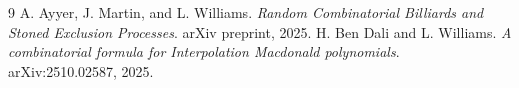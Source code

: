 \documentclass[11pt]{article}
\begin{document}
\begin{thebibliography}{9}
 A. Ayyer, J. Martin, and L. Williams. \textit{Random Combinatorial Billiards and Stoned Exclusion Processes}. arXiv preprint, 2025.
 H. Ben Dali and L. Williams. \textit{A combinatorial formula for Interpolation Macdonald polynomials}. arXiv:2510.02587, 2025.
\end{thebibliography}
\end{document}
